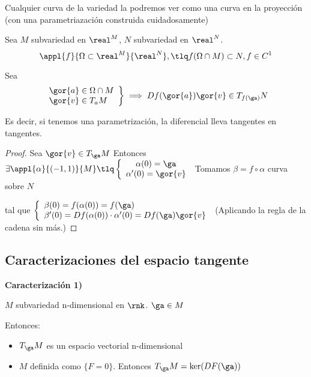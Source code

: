 \obs Cualquier curva de la variedad la podremos ver como una curva en la proyección (con una parametriazación construida cuidadosamente)

\begin{theorem}
Sea $M$ subvariedad en $\real^M$, $N$ subvariedad en $\real^N$.
\[\appl{f}{\Omega\subset\real^M}{\real^N}, \tlq f(\Omega\cap M) \subset N, f\in C^1\]

Sea \[\left.\begin{array}{lc}
\gor{a} \in \Omega\cap M \\ 
\gor{v} \in T_aM
\end{array}\right\} 
\implies Df(\gor{a})\gor{v} \in T_{f(\ga)}N\]
\end{theorem}

Es decir, si tenemos una parametrización, la diferencial lleva tangentes en tangentes.

\begin{proof}
Sea $\gor{v} \in T_{\ga} M$
Entonces $\exists \appl{\alpha}{(-1,1)}{M} \tlq \left\{\begin{array}{c}
\alpha(0) = \ga\\
\alpha'(0) = \gor{v}
\end{array}\right.$
Tomamos $\beta = f \circ \alpha$ curva sobre $N$ 

tal que $\left\{\begin{array}{lc} \beta(0) = f(\alpha(0)) = f(\ga)\\ 
\beta'(0) = Df(\alpha(0))\cdot \alpha'(0) = Df(\ga)\gor{v}\end{array}\right.$ (Aplicando la regla de la cadena sin más.)
\end{proof}


\subsection{Caracterizaciones del espacio tangente}
\textbf{Caracterización 1)}
\begin{theorem}\label{thmCaractTangente1}

$M$ subvariedad n-dimensional en $\rnk$. $\ga \in M$

Entonces:

\begin{itemize}
\item $T_{\ga}M$ es un espacio vectorial n-dimensional
\item $M$ definida como $\{F = 0\}$. Entonces $T_{\ga} M = \ker(DF(\ga))$
\end{itemize}
\end{theorem}

